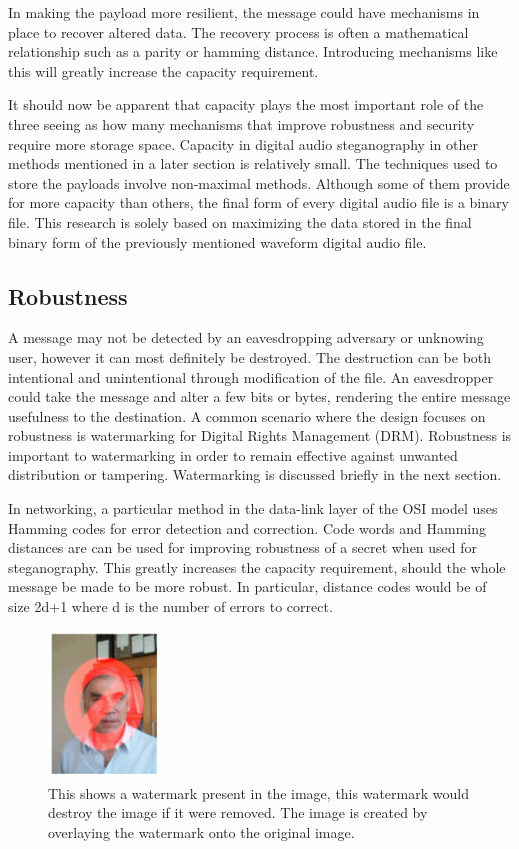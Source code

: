 \documentclass[letterpaper]{article}
\begin{document}
In making the payload more resilient, the message could have mechanisms in place to recover altered data. The recovery process is often a mathematical relationship such as a parity or hamming distance. Introducing mechanisms like this will greatly increase the capacity requirement. 

It should now be apparent that capacity plays the most important role of the three seeing as how many mechanisms that improve robustness and security require more storage space. Capacity in digital audio steganography in other methods mentioned in a later section is relatively small. The techniques used to store the payloads involve non-maximal methods. Although some of them provide for more capacity than others, the final form of every digital audio file is a binary file. This research is solely based on maximizing the data stored in the final binary form of the previously mentioned waveform digital audio file.


\subsection{Robustness}
A message may not be detected by an eavesdropping adversary or unknowing user, however it can most definitely be destroyed. The destruction can be both intentional and unintentional through modification of the file. An eavesdropper could take the message and alter a few bits or bytes, rendering the entire message usefulness to the destination. A common scenario where the design focuses on robustness is watermarking for Digital Rights Management (DRM). Robustness is important to watermarking in order to remain effective against unwanted distribution or tampering. Watermarking is discussed briefly in the next section.

In networking, a particular method in the data-link layer of the OSI model uses Hamming codes for error detection and correction. Code words and Hamming distances are can be used for improving robustness of a secret when used for steganography. This greatly increases the capacity requirement, should the whole message be made to be more robust. In particular, distance codes would be of size 2d+1 where d is the number of errors to correct.\cite{tanenbaum2003computer} 

\begin{figure}[h]
    \centering
    \includegraphics[width=3cm]{images/watermark.png}
    \caption{This shows a watermark present in the image, this watermark would destroy the image if it were removed. The image is created by overlaying the watermark onto the original image.}
    \label{fig:ukstego}
\end{figure}
\end{document}

